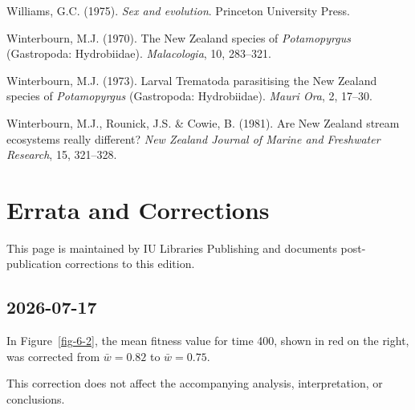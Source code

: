 \documentclass[
  american,
  letterpaper,
]{book}
\newlength{\cslhangindent}
\newenvironment{CSLReferences}[2] %
 {\begin{list}{}{%
  \setlength{\itemindent}{0pt}
  \setlength{\leftmargin}{0pt}
  \setlength{\parsep}{0pt}
  \ifodd #1
   \setlength{\leftmargin}{\cslhangindent}
   \setlength{\itemindent}{-1\cslhangindent}
  \fi
  \setlength{\itemsep}{#2\baselineskip}}}
 {\end{list}}
\begin{document}
\begin{CSLReferences}{1}{0}
Williams, G.C. (1975). \emph{Sex and evolution}. Princeton University
Press.

Winterbourn, M.J. (1970). The {New Zealand} species of
\emph{{P}otamopyrgus} ({G}astropoda: {H}ydrobiidae). \emph{Malacologia},
10, 283--321.

Winterbourn, M.J. (1973). Larval {Trematoda} parasitising the {New
Zealand} species of \emph{{P}otamopyrgus} ({G}astropoda: {H}ydrobiidae).
\emph{Mauri Ora}, 2, 17--30.

Winterbourn, M.J., Rounick, J.S. \& Cowie, B. (1981). Are {New Zealand}
stream ecosystems really different? \emph{New Zealand Journal of Marine
and Freshwater Research}, 15, 321--328.

\end{CSLReferences}


\chapter*{Errata and Corrections}\label{errata-and-corrections}


This page is maintained by IU Libraries Publishing and documents
post-publication corrections to this edition.

\section*{2026-07-17}\label{section}


In Figure~\ref{fig-6-2}, the mean fitness value for time 400, shown in
red on the right, was corrected from \(\bar{w} = 0.82\) to
\(\bar{w} = 0.75\).

This correction does not affect the accompanying analysis,
interpretation, or conclusions.


\backmatter
\end{document}
